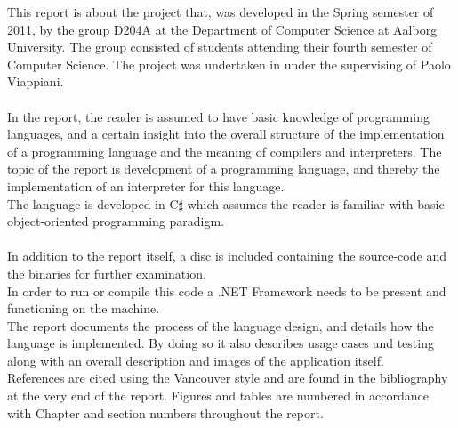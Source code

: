 This report is about the project that, was developed in the Spring semester of 2011, by the group D204A at the Department of Computer Science at Aalborg University. The group consisted of students attending their fourth semester of Computer Science. The project was undertaken in under the supervising of Paolo Viappiani. \\
\\
In the report, the reader is assumed to have basic knowledge of programming languages, and a certain insight into the overall structure of the implementation of a programming language and the meaning of compilers and interpreters. The topic of the report is development of a programming language, and thereby the implementation of an interpreter for this language. \\
The language is developed in C$\sharp$ which assumes the reader is familiar with basic object-oriented programming paradigm. \\
\\
In addition to the report itself, a disc is included containing the source-code and the binaries for further examination. \\
In order to run or compile this code a .NET Framework needs to be present and functioning on the machine. \\

The report documents the process of the language design, and details how the language is implemented. By doing so it also describes usage cases and testing along with an overall description and images of the application itself. \\

References are cited using the Vancouver style and are found in the bibliography at the very end of the report. 
Figures and tables are numbered in accordance with Chapter and section numbers throughout the report.

\newpage\mbox{}\newpage